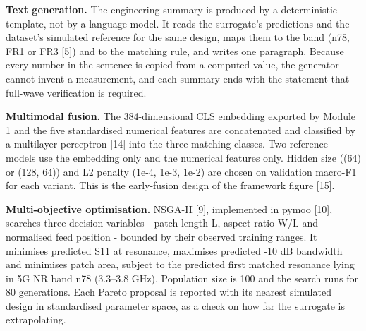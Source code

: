 \documentclass[11pt,a4paper]{article}
\begin{document}
\textbf{Text generation.} The engineering summary is produced by a deterministic template, not by a language model. It reads the surrogate's predictions and the dataset's simulated reference for the same design, maps them to the band (n78, FR1 or FR3 [5]) and to the matching rule, and writes one paragraph. Because every number in the sentence is copied from a computed value, the generator cannot invent a measurement, and each summary ends with the statement that full-wave verification is required.

\textbf{Multimodal fusion.} The 384-dimensional CLS embedding exported by Module 1 and the five standardised numerical features are concatenated and classified by a multilayer perceptron [14] into the three matching classes. Two reference models use the embedding only and the numerical features only. Hidden size ((64) or (128, 64)) and L2 penalty (1e-4, 1e-3, 1e-2) are chosen on validation macro-F1 for each variant. This is the early-fusion design of the framework figure [15].

\textbf{Multi-objective optimisation.} NSGA-II [9], implemented in pymoo [10], searches three decision variables - patch length L, aspect ratio W/L and normalised feed position - bounded by their observed training ranges. It minimises predicted S11 at resonance, maximises predicted -10 dB bandwidth and minimises patch area, subject to the predicted first matched resonance lying in 5G NR band n78 (3.3--3.8 GHz). Population size is 100 and the search runs for 80 generations. Each Pareto proposal is reported with its nearest simulated design in standardised parameter space, as a check on how far the surrogate is extrapolating.
\end{document}
